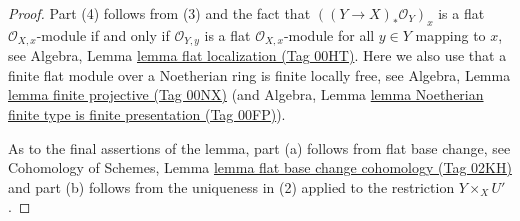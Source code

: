 \documentclass{amsart}
\theoremstyle{plain}
\theoremstyle{definition}
\theoremstyle{remark}
\numberwithin{equation}{subsection}
\begin{document}
\begin{proof}
\medskip\noindent
Part (4) follows from (3) and the fact that $((Y \to X)_*\mathcal{O}_Y)_x$
is a flat $\mathcal{O}_{X, x}$-module if and only if $\mathcal{O}_{Y, y}$
is a flat $\mathcal{O}_{X, x}$-module for all $y \in Y$ mapping to $x$, see
Algebra, Lemma \href{https://stacks.math.columbia.edu/tag/00HT}{lemma flat localization (Tag 00HT)}. Here we also
use that a finite flat module over a Noetherian ring is finite locally
free, see Algebra, Lemma \href{https://stacks.math.columbia.edu/tag/00NX}{lemma finite projective (Tag 00NX)}
(and
Algebra, Lemma
\href{https://stacks.math.columbia.edu/tag/00FP}{lemma Noetherian finite type is finite presentation (Tag 00FP)}).

\medskip\noindent
As to the final assertions of the lemma, part (a) follows from
flat base change, see
Cohomology of Schemes, Lemma \href{https://stacks.math.columbia.edu/tag/02KH}{lemma flat base change cohomology (Tag 02KH)}
and part (b) follows from the uniqueness in (2) applied to the restriction
$Y \times_X U'$.
\end{proof}
\end{document}
